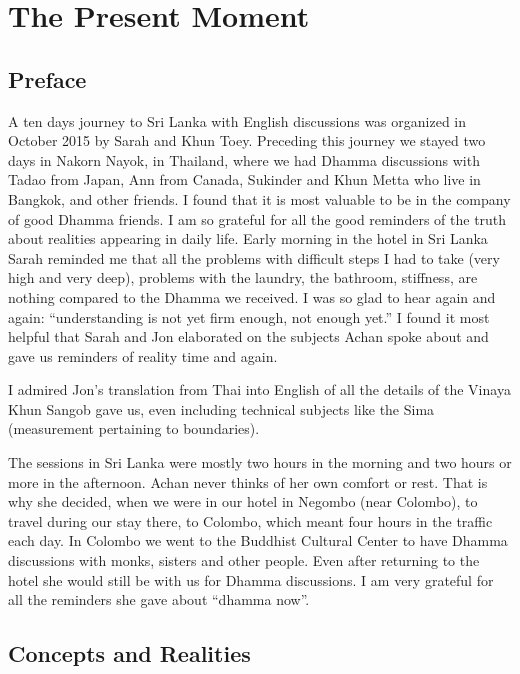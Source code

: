 \part{The Present Moment}




\chapter{Preface} 


A ten days journey to Sri Lanka with English discussions was organized in October 
2015 by Sarah and Khun Toey. Preceding this journey we stayed two days in Nakorn 
Nayok, in Thailand, where we had Dhamma discussions with Tadao from Japan, Ann 
from Canada, Sukinder and Khun Metta who live in Bangkok, and other friends. I 
found that it is most valuable to be in the company of good Dhamma friends. I am so 
grateful for all the good reminders of the truth about realities appearing in daily life. 
Early morning in the hotel in Sri Lanka Sarah reminded me that all the problems with 
difficult steps I had to take (very high and very deep), problems with the laundry, the 
bathroom, stiffness, are nothing compared to the Dhamma we received. I was so glad 
to hear again and again: ``understanding is not yet firm enough, not enough yet.'' I 
found it most helpful that Sarah and Jon elaborated on the subjects Achan spoke 
about and gave us reminders of reality time and again. 

I admired Jon's translation from Thai into English of all the details of the Vinaya 
Khun Sangob gave us, even including technical subjects like the Sima (measurement 
pertaining to boundaries). 

The sessions in Sri Lanka were mostly two hours in the morning and two hours or 
more in the afternoon. Achan never thinks of her own comfort or rest. That is why 
she decided, when we were in our hotel in Negombo (near Colombo), to travel during 
our stay there, to Colombo, which meant four hours in the traffic each day. In Colombo we went to the Buddhist Cultural Center to have Dhamma discussions with 
monks, sisters and other people. Even after returning to the hotel she would still be 
with us for Dhamma discussions. I am very grateful for all the reminders she gave 
about ``dhamma now''. 





\chapter{Concepts and Realities} 




